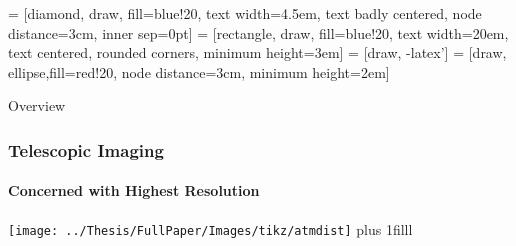 \documentclass{beamer}
\newcommand{\btVFill}{\vskip0pt plus 1filll}
\begin{document}
  
 = [diamond, draw, fill=blue!20, 
    text width=4.5em, text badly centered, node distance=3cm, inner sep=0pt]
 = [rectangle, draw, fill=blue!20, 
    text width=20em, text centered, rounded corners, minimum height=3em]
 = [draw, -latex']
 = [draw, ellipse,fill=red!20, node distance=3cm,
    minimum height=2em]


\begin{frame}{Overview}
\center
\vspace{-.5cm}
\end{frame}


\begin{frame}
  \frametitle{Telescopic Imaging}
  \framesubtitle{Concerned with Highest Resolution}
  \center
  \texttt{[image: ../Thesis/FullPaper/Images/tikz/atmdist]}
	  \bigskip
	  \btVFill

\end{frame}
\end{document}
